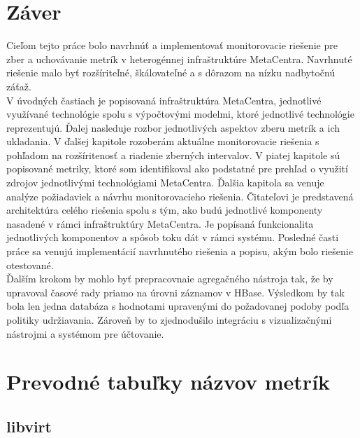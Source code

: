 \documentclass[printed,11pt,twoside,color,cover,table]{fithesis3}
\begin{document}
\chapter{Záver}
Cieľom tejto práce bolo navrhnúť a implementovať monitorovacie riešenie pre zber a uchovávanie metrík v heterogénnej infraštruktúre MetaCentra. 
Navrhnuté riešenie malo byť rozšíriteľné, škálovateľné a s dôrazom na nízku nadbytočnú záťaž.
\\V úvodných častiach je popisovaná infraštruktúra MetaCentra, jednotlivé využívané technológie spolu s výpočtovými modelmi, ktoré
jednotlivé technológie reprezentujú. Ďalej nasleduje rozbor jednotlivých aspektov zberu metrík a ich ukladania.
V ďalšej kapitole rozoberám aktuálne monitorovacie riešenia s pohľadom na rozšíritenosť a riadenie zberných intervalov. V piatej kapitole
sú popisované metriky, ktoré som identifikoval ako podstatné pre prehľad o využití zdrojov jednotlivými technológiami MetaCentra.
Ďalšia kapitola sa venuje analýze požiadaviek a návrhu monitorovacieho riešenia. Čitateľovi je predstavená architektúra celého 
riešenia spolu s tým, ako budú jednotlivé komponenty nasadené v rámci infraštruktúry MetaCentra. Je popísaná funkcionalita
jednotlivých komponentov a spôsob toku dát v rámci systému. Posledné časti práce sa venujú implementácií navrhnutého riešenia a popisu,
akým bolo riešenie otestované.
\\Ďalším krokom by mohlo byť prepracovnaie agregačného 
nástroja tak, že by upravoval časové rady priamo na úrovni záznamov v HBase. Výsledkom by tak bola len jedna databáza s hodnotami upravenými
do požadovanej podoby podľa politiky udržiavania. Zároveň by to zjednodušilo integráciu s vizualizačnými nástrojmi a systémom pre účtovanie.

\printbibliography[heading=bibintoc]

\appendix
\chapter{Prevodné tabuľky názvov metrík}
\section{libvirt}
\end{document}
